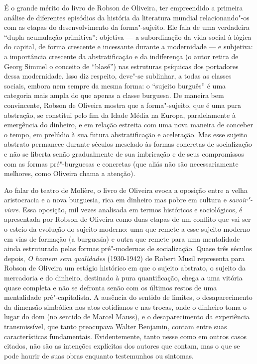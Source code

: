 É o grande mérito do livro de Robson de Oliveira, ter empreendido a
primeira análise de diferentes episódios da história da literatura
mundial relacionando"-os com as etapas do desenvolvimento da
forma"-sujeito. Ele fala de uma verdadeira ``dupla acumulação
primitiva'': objetiva --- a subordinação da vida social à lógica do
capital, de forma crescente e incessante durante a modernidade --- e
subjetiva: a importância crescente da abstratificação e da indiferença
(o autor retira de Georg Simmel o conceito de ``blasé'') nas estruturas
psíquicas dos portadores dessa modernidade. Isso diz respeito, deve"-se
sublinhar, a todas as classes sociais, embora nem sempre da mesma forma:
o ``sujeito burguês'' é uma categoria mais ampla do que apenas a classe
burguesa. De maneira bem convincente, Robson de Oliveira mostra que a forma"-sujeito,
que é uma pura abstração, se constitui pelo fim da Idade Média na
Europa, paralelamente à emergência do dinheiro, e em relação estreita
com uma nova maneira de conceber o tempo, em prelúdio à sua futura
abstratificação e aceleração. Mas esse sujeito abstrato permanece
durante séculos mesclado às formas concretas de socialização e não se
liberta senão gradualmente de sua imbricação e de seus compromissos com
as formas pré"-burguesas e concretas (que aliás não são necessariamente
melhores, como Oliveira chama a atenção).

Ao falar do teatro de Molière, o livro de Oliveira evoca a oposição
entre a velha aristocracia e a nova burguesia, rica em dinheiro mas
pobre em cultura e \emph{savoir"-vivre}. Essa oposição, mil vezes
analisada em termos históricos e sociológicos, é apresentada por Robson
de Oliveira como duas etapas de um conflito que vai ser o esteio da
evolução do sujeito moderno: uma que remete a esse sujeito moderno em
vias de formação (a burguesia) e outra que remete para uma mentalidade
ainda estruturada pelas formas pré"-modernas de socialização. Quase três
séculos depois, \emph{O homem sem qualidades} (1930-1942) de Robert
Musil representa para Robson de Oliveira um estágio histórico em que o
sujeito abstrato, o sujeito da mercadoria e do dinheiro, destinado à
pura quantificação, chega a uma vitória quase completa e não se defronta
senão com os últimos restos de uma mentalidade pré"-capitalista. A
ausência do sentido de limites, o desaparecimento da dimensão simbólica
nos atos cotidianos e nas trocas, onde o dinheiro toma o lugar do dom (no
sentido de Marcel Mauss), e o desaparecimento da experiência
transmissível, que tanto preocupava Walter Benjamin, contam entre suas
características fundamentais. Evidentemente, tanto nesse como em outros
casos citados, não são as intenções explícitas dos autores que contam,
mas o que se pode haurir de suas obras enquanto testemunhos ou
sintomas.

